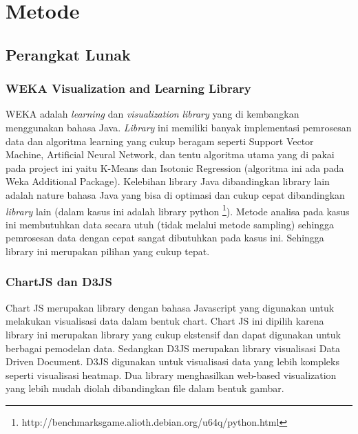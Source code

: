 \documentclass{article}
\begin{document}
\section{Metode}

\subsection{Perangkat Lunak}

\subsubsection{WEKA Visualization and Learning Library}
\begin{adjustwidth}{4em}{0pt}

\hspace{\parindent}WEKA adalah \textit{learning} dan \textit{visualization} \textit{library} yang di kembangkan menggunakan bahasa Java. \textit{Library} ini memiliki banyak implementasi pemrosesan data dan algoritma learning yang cukup beragam seperti Support Vector Machine, Artificial Neural Network, dan tentu algoritma utama yang di pakai pada project ini yaitu K-Means dan Isotonic Regression (algoritma ini ada pada Weka Additional Package). Kelebihan library Java dibandingkan library lain adalah nature bahasa Java yang bisa di optimasi dan cukup cepat dibandingkan \textit{library} lain (dalam kasus ini adalah library python \footnote{http://benchmarksgame.alioth.debian.org/u64q/python.html}). Metode analisa pada kasus  ini membutuhkan data secara utuh (tidak melalui metode sampling) sehingga pemrosesan data dengan cepat sangat dibutuhkan pada kasus ini. Sehingga library ini merupakan pilihan yang cukup tepat.

\end{adjustwidth}

\subsubsection{ChartJS dan D3JS}
\begin{adjustwidth}{4em}{0pt}
	
\hspace{\parindent}Chart JS merupakan library dengan bahasa Javascript yang digunakan untuk melakukan visualisasi data dalam bentuk chart. Chart JS ini dipilih karena library ini merupakan library yang cukup ekstensif dan dapat digunakan untuk berbagai pemodelan data. Sedangkan D3JS merupakan library visualisasi Data Driven Document. D3JS digunakan untuk visualisasi data yang lebih kompleks seperti visualisasi heatmap. Dua library menghasilkan web-based visualization yang lebih mudah diolah dibandingkan file dalam bentuk gambar.

\end{adjustwidth}
\end{document}
